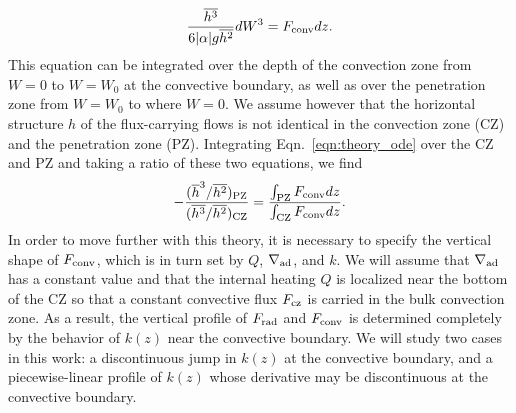 \documentclass{aastex631}
\newcommand{\gradad}{\ensuremath{\nabla_{\rm{ad}}}}
\newcommand{\Frad}{\ensuremath{F_{\rm{rad}}}}
\newcommand{\Fconv}{\ensuremath{F_{\rm{conv}}}}
\newcommand{\Fcz}{\ensuremath{F_{\rm{cz}}}}
\begin{document}
\begin{equation}
\frac{\overline{h^3}}{6 |\alpha| g \overline{h^2}} dW^3 = \Fconv dz.
\label{eqn:theory_ode}
\end{equation}
This equation can be integrated over the depth of the convection zone from $W = 0$ to $W = W_0$ at the convective boundary, as well as over the penetration zone from $W = W_0$ to where $W = 0$.
We assume however that the horizontal structure $h$ of the flux-carrying flows is not identical in the convection zone (CZ) and the penetration zone (PZ).
Integrating Eqn.~\ref{eqn:theory_ode} over the CZ and PZ and taking a ratio of these two equations, we find
\begin{equation}
-\frac{(\overline{h}^3/\overline{h^2})_{\rm{PZ}}}{(\overline{h^3}/\overline{h^2})_{\rm{CZ}}} = 
\frac{\int_{\rm{PZ}} \Fconv dz}{\int_{\rm{CZ}} \Fconv dz}.
\label{eqn:theory_fraction}
\end{equation}
In order to move further with this theory, it is necessary to specify the vertical shape of $\Fconv$, which is in turn set by $Q$, $\gradad$, and $k$.
We will assume that $\gradad$ has a constant value and that the internal heating $Q$ is localized near the bottom of the CZ so that a constant convective flux $\Fcz$ is carried in the bulk convection zone.
As a result, the vertical profile of $\Frad$ and $\Fconv$ is determined completely by the behavior of $k(z)$ near the convective boundary.
We will study two cases in this work: a discontinuous jump in $k(z)$ at the convective boundary, and a piecewise-linear profile of $k(z)$ whose derivative may be discontinuous at the convective boundary.
\end{document}
